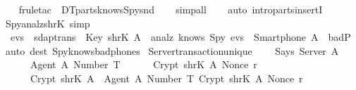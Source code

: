 \begin{isabellebody}
  \ \ \isamarkupfalse%
  \ {\isacharparenleft}frule{\isacharunderscore}tac\ {\isacharbrackleft}{}{\isacharbrackright}\ DT{}{\isacharunderscore}parts{\isacharunderscore}knows{\isacharunderscore}Spy{\isacharunderscore}snd{\isacharparenright}\isanewline
  \ \ \isamarkupfalse%
  \ {\isacharparenleft}simp{\isacharunderscore}all{\isacharparenright}\isanewline
  \ \ \isamarkupfalse%
  \ {\isacharparenleft}auto\ intro{\isacharbang}{\isacharcolon}parts{\isacharunderscore}insertI{\isacharparenright}\isanewline
  \isamarkupfalse%
  \endisatagproof
  {\isafoldproof}%
  \isadelimproof
  \isanewline
  \endisadelimproof
  \isanewline
  \isamarkupfalse%
  \ Spy{\isacharunderscore}analz{\isacharunderscore}shrK\ {\isacharbrackleft}simp{\isacharbrackright}\ {\isacharcolon}\isanewline
  \ \ {\isachardoublequoteopen}evs\ {\isasymin}\ sdaptrans\ {\isasymLongrightarrow}\ {\isacharparenleft}Key\ {\isacharparenleft}shrK\ A{\isacharparenright}\ {\isasymin}\ analz\ {\isacharparenleft}knows\ Spy\ evs{\isacharparenright}{\isacharparenright}\ {\isacharequal}\ {\isacharparenleft}Smartphone\ A\ {\isasymin}\ badP{\isacharparenright}{\isachardoublequoteclose}\ \isanewline
  \isadelimproof
  \endisadelimproof
  \isatagproof
  \isamarkupfalse%
  \ {\isacharparenleft}auto\ dest{\isacharbang}{\isacharcolon}\ Spy{\isacharunderscore}knows{\isacharunderscore}bad{\isacharunderscore}phones{\isacharparenright}%
  \endisatagproof
  {\isafoldproof}%
  \isadelimproof
  \endisadelimproof
  \isadelimdocument
  \endisadelimdocument
  \isatagdocument
  \isamarkuptrue%
  \endisatagdocument
  {\isafolddocument}%
  \isadelimdocument
  \endisadelimdocument
  \isamarkupfalse%
  \ Server{\isacharunderscore}transaction{\isacharunderscore}unique\ {\isacharcolon}\isanewline
  \ \ {\isachardoublequoteopen}{\isasymlbrakk}\ Says\ Server\ A\ {\isasymlbrace}\isanewline
  \ \ \ \ \ \ {\isasymlbrace}Agent\ A{\isacharcomma}\ Number\ T{\isasymrbrace}{\isacharcomma}\isanewline
  \ \ \ \ \ \ Crypt\ {\isacharparenleft}shrK\ A{\isacharparenright}\ {\isacharparenleft}Nonce\ r{\isacharparenright}{\isacharcomma}\isanewline
  \ \ \ \ \ \ Crypt\ {\isacharparenleft}shrK\ A{\isacharparenright}\ {\isasymlbrace}\ {\isasymlbrace}Agent\ A{\isacharcomma}\ Number\ T{\isasymrbrace}{\isacharcomma}\ Crypt\ {\isacharparenleft}shrK\ A{\isacharparenright}\ {\isacharparenleft}Nonce\ r{\isacharparenright}\ {\isasymrbrace}\isanewline

\end{isabellebody}
